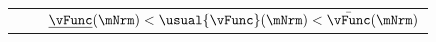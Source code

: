 \begin{table}
{\begin{tabular}{|l|l|l|}
        \\                                                                                                                      &    & $\underline{\vFunc}(\mNrm) < \usual{\vFunc}(\mNrm) < \bar{\vFunc}(\mNrm)$ %


\end{tabular}}
\end{table}
